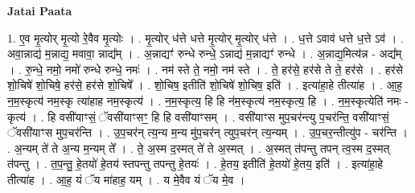 \documentclass[17pt]{extarticle}
\begin{document}
\textbf{Jatai Paata} \newline

1. ए॒व मृ॒त्योर् मृ॒त्यो रे॒वैव मृ॒त्योः । . मृ॒त्योर् ध॑त्ते धत्ते मृ॒त्योर् मृ॒त्योर् ध॑त्ते । . ध॒त्ते ऽवाव॑ धत्ते ध॒त्ते ऽव॑ । . अवा॒न्नाद्य॑ म॒न्नाद्य॒ मवावा॒ न्नाद्य᳚म् । . अ॒न्नाद्यꣳ॑ रुन्धे रुन्धे॒ ऽन्नाद्य॑ म॒न्नाद्यꣳ॑ रुन्धे । . अ॒न्नाद्य॒मित्य॑न्न - अद्य᳚म् । . रु॒न्धे॒ नमो॒ नमो॑ रुन्धे रुन्धे॒ नमः॑ । . नम॑ स्ते ते॒ नमो॒ नम॑ स्ते । . ते॒ हर॑से॒ हर॑से ते ते॒ हर॑से । . हर॑से शो॒चिषे॑ शो॒चिषे॒ हर॑से॒ हर॑से शो॒चिषे᳚ । . शो॒चिष॒ इतीति॑ शो॒चिषे॑ शो॒चिष॒ इति॑ । . इत्या॑हा॒हे तीत्या॑ह । . आ॒ह॒ न॒म॒स्कृत्य॑ नम॒स्कृ त्या॑हाह नम॒स्कृत्य॑ । . न॒म॒स्कृत्य॒ हि हि न॑म॒स्कृत्य॑ नम॒स्कृत्य॒ हि । . न॒म॒स्कृत्येति॑ नमः - कृत्य॑ । . हि वसी॑याꣳसं॒ ॅवसी॑याꣳसꣳ॒॒ हि हि वसी॑याꣳसम् । . वसी॑याꣳस मुप॒चर॑न्त्यु प॒चर॑न्ति॒ वसी॑याꣳसं॒ ॅवसी॑याꣳस मुप॒चर॑न्ति । . उ॒प॒चर॑न् त्य॒न्य म॒न्य मु॑प॒चर॑न् त्युप॒चर॑न् त्य॒न्यम् । . उ॒प॒चर॒न्तीत्यु॑प - चर॑न्ति । . अ॒न्यम् ते॑ ते अ॒न्य म॒न्यम् ते᳚ । . ते॒ अ॒स्म द॒स्मत् ते॑ ते अ॒स्मत् । . अ॒स्मत् त॑पन्तु तपन् त्व॒स्म द॒स्मत् त॑पन्तु । . त॒प॒न्तु॒ हे॒तयो॑ हे॒तय॑ स्तपन्तु तपन्तु हे॒तयः॑ । . हे॒तय॒ इतीति॑ हे॒तयो॑ हे॒तय॒ इति॑ । . इत्या॑हा॒हे तीत्या॑ह । . आ॒ह॒ यं ॅय मा॑हाह॒ यम् । . य मे॒वैव यं ॅय मे॒व । \newline
\end{document}
